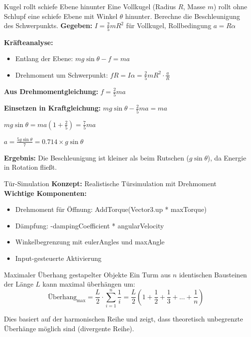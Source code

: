 \begin{example2}{Kugel rollt schiefe Ebene hinunter}
    Eine Vollkugel (Radius $R$, Masse $m$) rollt ohne Schlupf eine schiefe Ebene mit Winkel $\theta$ hinunter. Berechne die Beschleunigung des Schwerpunkts.
    \tcblower
    \textbf{Gegeben:} $I = \frac{2}{5}mR^2$ für Vollkugel, Rollbedingung $a = R\alpha$
    
    \textbf{Kräfteanalyse:}
    \begin{itemize}
        \item Entlang der Ebene: $mg\sin\theta - f = ma$
        \item Drehmoment um Schwerpunkt: $fR = I\alpha = \frac{2}{5}mR^2 \cdot \frac{a}{R}$
    \end{itemize}
    
    \textbf{Aus Drehmomentgleichung:} $f = \frac{2}{5}ma$
    
    \textbf{Einsetzen in Kraftgleichung:}
    $mg\sin\theta - \frac{2}{5}ma = ma$
    
    $mg\sin\theta = ma(1 + \frac{2}{5}) = \frac{7}{5}ma$
    
    $a = \frac{5g\sin\theta}{7} = 0.714 \times g\sin\theta$
    
    \textbf{Ergebnis:} Die Beschleunigung ist kleiner als beim Rutschen ($g\sin\theta$), da Energie in Rotation fließt.
\end{example2}

\begin{example2}{Tür-Simulation}
    \textbf{Konzept:} Realistische Türsimulation mit Drehmoment
    \tcblower
    \textbf{Wichtige Komponenten:}
    \begin{itemize}
        \item Drehmoment für Öffnung: AddTorque(Vector3.up * maxTorque)
        \item Dämpfung: -dampingCoefficient * angularVelocity
        \item Winkelbegrenzung mit eulerAngles und maxAngle
        \item Input-gesteuerte Aktivierung
    \end{itemize}
\end{example2}

\begin{example2}{Maximaler Überhang gestapelter Objekte}
    Ein Turm aus $n$ identischen Bausteinen der Länge $L$ kann maximal überhängen um:
    \begin{equation}
        \text{Überhang}_{\text{max}} = \frac{L}{2} \cdot \sum_{i=1}^{n} \frac{1}{i} = \frac{L}{2}(1 + \frac{1}{2} + \frac{1}{3} + ... + \frac{1}{n})
    \end{equation}
    
    Dies basiert auf der harmonischen Reihe und zeigt, dass theoretisch unbegrenzte Überhänge möglich sind (divergente Reihe).
\end{example2}